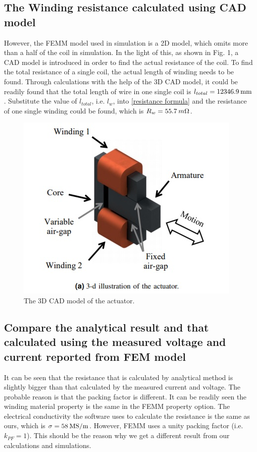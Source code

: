 \documentclass[a4paper]{IEEEtran}
\begin{document}
\subsection{The Winding resistance calculated using CAD model}
However, the FEMM model used in simulation is a 2D model, which omits more than a
half of the coil in simulation. In the light of this, as shown in Fig. 1, a CAD model is introduced in order to find the actual resistance
of the coil. To find the total resistance of a single coil, the actual length of winding needs to be found.
Through calculations
with the help of the 3D CAD model, it could be readily found that the total length of wire in one single coil is $l_{total}=12346.9\hskip 0.2em\text{mm}$.
Substitute the value of $l_{total}$, i.e. $l_w$, into \eqref{resistance formula} and the resistance of one single winding could be found,
which is $R_{w}=55.7\hskip 0.2emm\Omega$.
\begin{figure}[!ht]
\begin{centering}
\includegraphics[scale=0.8]{CAD_model_of_actuator.jpg}
\par\end{centering}   
\caption{The 3D CAD model of the actuator.\label{CAD model of actuator}}
\end{figure}   

\subsection{Compare the analytical result and that calculated using the measured voltage and current reported from FEM model}
It can be seen that the resistance that is calculated by analytical method is slightly bigger than that calculated by 
the measured current and voltage. The probable reason is that the packing factor is different. It can be readily seen the 
winding material property is the same in the FEMM property option. The electrical conductivity the software uses to calculate the 
resistance is the same as ours, which is $\sigma=58 \hskip 0.2em\text{MS/m}$. However, FEMM uses a unity packing factor (i.e. $k_{PF}=1$).
This should be the reason why we get a different result from our calculations and simulations.
\end{document}
